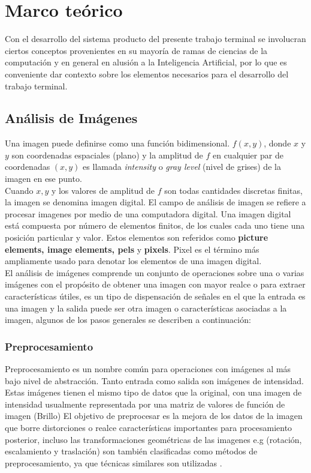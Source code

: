 \chapter{Marco teórico}
Con el desarrollo del sistema producto del presente trabajo terminal se involucran ciertos conceptos provenientes en su mayoría de ramas de ciencias de la computación y en general en alusión a la Inteligencia Artificial, por lo que es conveniente dar contexto sobre los elementos necesarios para el desarrollo del trabajo terminal.
\section{Análisis de Imágenes}\label{sec:imAnalysis}
		
		Una imagen puede definirse como una función bidimensional. $f(x,y)$, donde $x$ y $y$ son coordenadas espaciales (plano) y la amplitud de $f$ en cualquier par de coordenadas $(x,y)$ es llamada \textit{intensity} o \textit{gray level} (nivel de grises) de la imagen en ese punto.
		\\
		Cuando $x, y$ y los valores de amplitud de $f$ son todas cantidades discretas finitas, la imagen se denomina imagen digital. El campo de análisis de imagen se refiere a procesar imagenes por medio de una computadora digital. Una imagen digital está compuesta por número de elementos finitos, de los cuales cada uno tiene una posición particular y valor. Estos elementos son referidos como \textbf{picture elements, image elements, pels} y \textbf{pixels}. Pixel es el término más ampliamente usado para denotar los elementos de una imagen digital.
		\\
		
        El análisis de imágenes comprende un conjunto de operaciones sobre una o varias imágenes con el propósito de obtener una imagen con mayor realce o para extraer características útiles, es un tipo de dispensación de señales en el que la entrada es una imagen y la salida puede ser otra imagen o características asociadas a la imagen, algunos de los pasos generales se describen a continuación:
        
        \subsection{Preprocesamiento}
            Preprocesamiento es un nombre común para operaciones con imágenes al más bajo nivel de abstracción. Tanto entrada como salida son imágenes de intensidad. Estas imágenes tienen el mismo tipo de datos que la original, con una imagen de intensidad usualmente representada por una matriz de valores de función de imagen (Brillo) El objetivo de preprocesar es la mejora de los datos de la imagen que borre distorciones o realce características importantes para procesamiento posterior, incluso las transformaciones geométricas de las imagenes e.g (rotación, escalamiento y traslación) son también clasificadas como métodos de preprocesamiento, ya que técnicas similares son utilizadas \cite{imgAnalySeg}.
               
